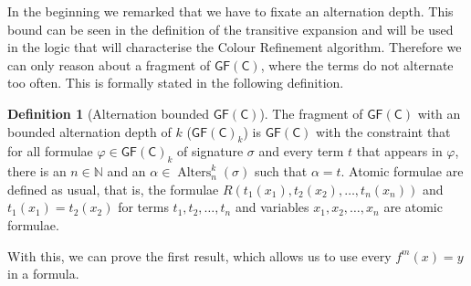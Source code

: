 \documentclass[a4paper,11pt,DIV=15]{scrartcl} %
\renewcommand{\phi}{\varphi}
\theoremstyle{plain}
\theoremstyle{definition}
\newtheorem{definition}[theorem]{Definition}
\newcommand{\GFC}{\mathsf{GF}(\mathsf{C})}
\begin{document}
In the beginning we remarked that we have to fixate an alternation depth.
This bound can be seen in the definition of the transitive expansion and will be used in the logic that will characterise the Colour Refinement algorithm.
Therefore we can only reason about a fragment of $\GFC$, where the terms do not alternate too often.
This is formally stated in the following definition.

\begin{definition}[Alternation bounded $\GFC$]
	The fragment of $\GFC$ with an bounded alternation depth of $k$ ($\GFC_k$) is $\GFC$ with the constraint that for all formulae $\phi\in\GFC_k$ of signature $\sigma$ and every term $t$ that appears in $\phi$, there is an $n\in \mathbb{N}$ and an $\alpha\in \operatorname{Alters}_n^k(\sigma)$ such that $\alpha=t$.
	Atomic formulae are defined as usual, that is, the formulae $R(t_1(x_1),t_2(x_2),\dots,t_n(x_n))$ and $t_1(x_1)=t_2(x_2)$ for terms $t_1,t_2,\dots,t_n$ and variables $x_1,x_2,\dots,x_n$ are atomic formulae.
\end{definition}

With this, we can prove the first result, which allows us to use every $f^m(x)=y$ in a formula.
\end{document}
